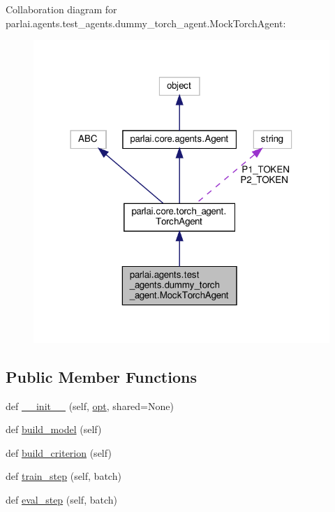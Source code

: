 Collaboration diagram for parlai.\+agents.\+test\+\_\+agents.\+dummy\+\_\+torch\+\_\+agent.\+Mock\+Torch\+Agent\+:
\nopagebreak
\begin{figure}[H]
\begin{center}
\leavevmode
\includegraphics[width=318pt]{classparlai_1_1agents_1_1test__agents_1_1dummy__torch__agent_1_1MockTorchAgent__coll__graph}
\end{center}
\end{figure}
\subsection*{Public Member Functions}
\begin{DoxyCompactItemize}
\item 
def \hyperlink{classparlai_1_1agents_1_1test__agents_1_1dummy__torch__agent_1_1MockTorchAgent_af14024f59e4ea3dea5c7ff38caff89ad}{\+\_\+\+\_\+init\+\_\+\+\_\+} (self, \hyperlink{classparlai_1_1core_1_1torch__agent_1_1TorchAgent_a785bb920cf8c8afc3e9bf6a8b77e335a}{opt}, shared=None)
\item 
def \hyperlink{classparlai_1_1agents_1_1test__agents_1_1dummy__torch__agent_1_1MockTorchAgent_a8d6b885ba3adcee439eab49922e584a4}{build\+\_\+model} (self)
\item 
def \hyperlink{classparlai_1_1agents_1_1test__agents_1_1dummy__torch__agent_1_1MockTorchAgent_a457b269132e6c4ec92308ce87aa85336}{build\+\_\+criterion} (self)
\item 
def \hyperlink{classparlai_1_1agents_1_1test__agents_1_1dummy__torch__agent_1_1MockTorchAgent_a867115faed3455518fb1f9a0ab41f761}{train\+\_\+step} (self, batch)
\item 
def \hyperlink{classparlai_1_1agents_1_1test__agents_1_1dummy__torch__agent_1_1MockTorchAgent_aea8dfe6e44a419f31e741c4770a82f9b}{eval\+\_\+step} (self, batch)
\end{DoxyCompactItemize}
